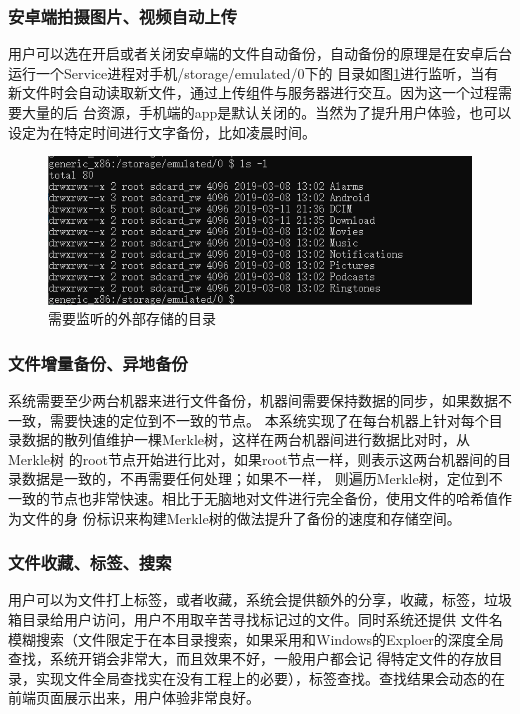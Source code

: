 \subsubsection{安卓端拍摄图片、视频自动上传}
用户可以选在开启或者关闭安卓端的文件自动备份，自动备份的原理是在安卓后台运行一个Service进程对手机/storage/emulated/0下的
目录如图\ref{android_dir}进行监听，当有新文件时会自动读取新文件，通过上传组件与服务器进行交互。因为这一个过程需要大量的后
台资源，手机端的app是默认关闭的。当然为了提升用户体验，也可以设定为在特定时间进行文字备份，比如凌晨时间。
\begin{figure}[H]
  \centering
  \includegraphics[width=130mm]{./figures/android_dir.png}
  \caption{需要监听的外部存储的目录}
  \label{android_dir}
\end{figure}

\subsubsection{文件增量备份、异地备份}
系统需要至少两台机器来进行文件备份，机器间需要保持数据的同步，如果数据不一致，需要快速的定位到不一致的节点。
本系统实现了在每台机器上针对每个目录数据的散列值维护一棵Merkle树，这样在两台机器间进行数据比对时，从Merkle树
的root节点开始进行比对，如果root节点一样，则表示这两台机器间的目录数据是一致的，不再需要任何处理；如果不一样，
则遍历Merkle树，定位到不一致的节点也非常快速。相比于无脑地对文件进行完全备份，使用文件的哈希值作为文件的身
份标识来构建Merkle树的做法提升了备份的速度和存储空间。

\subsubsection{文件收藏、标签、搜索}
用户可以为文件打上标签，或者收藏，系统会提供额外的分享，收藏，标签，垃圾箱目录给用户访问，用户不用取辛苦寻找标记过的文件。同时系统还提供
文件名模糊搜索（文件限定于在本目录搜索，如果采用和Windows的Exploer的深度全局查找，系统开销会非常大，而且效果不好，一般用户都会记
得特定文件的存放目录，实现文件全局查找实在没有工程上的必要），标签查找。查找结果会动态的在前端页面展示出来，用户体验非常良好。

